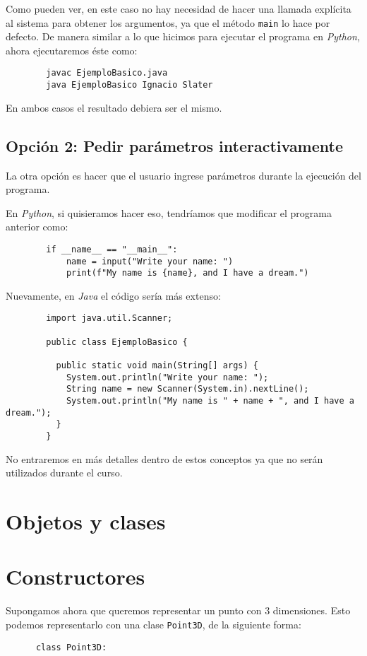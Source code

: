      Como pueden ver, en este caso no hay necesidad de hacer una llamada explícita al 
      sistema para obtener los argumentos, ya que el método \texttt{main} lo hace por 
      defecto.
      De manera similar a lo que hicimos para ejecutar el programa en \textit{Python}, 
      ahora ejecutaremos éste como:

      \begin{verbatim}
        javac EjemploBasico.java
        java EjemploBasico Ignacio Slater
      \end{verbatim}      

      En ambos casos el resultado debiera ser el mismo.

    \subsection{Opción 2: Pedir parámetros interactivamente}
      La otra opción es hacer que el usuario ingrese parámetros durante la ejecución del 
      programa.

      En \textit{Python}, si quisieramos hacer eso, tendríamos que modificar el programa 
      anterior como:

      \begin{verbatim}
        if __name__ == "__main__":
            name = input("Write your name: ")
            print(f"My name is {name}, and I have a dream.")
      \end{verbatim}

      Nuevamente, en \textit{Java} el código sería más extenso:

      \begin{verbatim}
        import java.util.Scanner;

        public class EjemploBasico {

          public static void main(String[] args) {
            System.out.println("Write your name: ");
            String name = new Scanner(System.in).nextLine();
            System.out.println("My name is " + name + ", and I have a dream.");
          }
        }
      \end{verbatim}

      No entraremos en más detalles dentro de estos conceptos ya que no serán utilizados 
      durante el curso.

  \section{Objetos y clases}
    

  \section{Constructores}
    Supongamos ahora que queremos representar un punto con 3 dimensiones.
    Esto podemos representarlo con una clase \texttt{Point3D}, de la siguiente forma:

    \begin{verbatim}
      class Point3D:
        
    \end{verbatim}
%